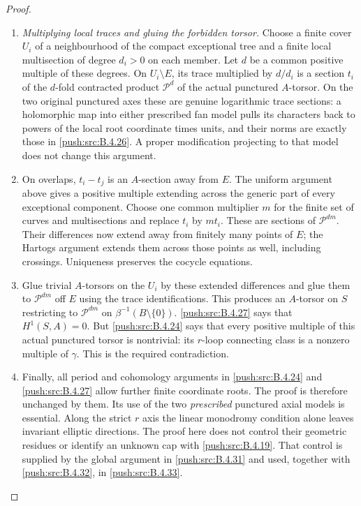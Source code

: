 \begin{proof}
\begin{enumerate}[label=\arabic*.,leftmargin=*]
\item \emph{Multiplying local traces and gluing the forbidden torsor.}
Choose a finite cover $U_i$ of a
neighbourhood of the compact exceptional
tree and a finite local multisection of
degree $d_i>0$ on each member. Let $d$ be
a common positive multiple of these degrees.
On $U_i\setminus E$, its trace multiplied
by $d/d_i$ is a section $t_i$ of the
$d$-fold contracted product $\mathcal P^d$
of the actual punctured $A$-torsor.
On the two original punctured axes these
are genuine logarithmic trace sections:
a holomorphic map into either prescribed
fan model pulls its characters back to
powers of the local root coordinate times
units, and their norms are exactly those
in \ref{push:src:B.4.26}. A proper modification projecting
to that model does not change this argument.

\item On overlaps, $t_i-t_j$ is an $A$-section
away from $E$. The uniform argument above
gives a positive multiple extending across
the generic part of every exceptional
component. Choose one common multiplier
$m$ for the finite set of curves and
multisections and replace $t_i$ by $mt_i$.
These are sections of $\mathcal P^{dm}$.
Their differences now extend away from
finitely many points of $E$; the Hartogs
argument extends them across those points
as well, including crossings. Uniqueness
preserves the cocycle equations.

\item Glue trivial $A$-torsors on the $U_i$ by
these extended differences and glue them
to $\mathcal P^{dm}$ off $E$ using the
trace identifications. This produces an
$A$-torsor on $S$ restricting to
$\mathcal P^{dm}$ on
$\beta^{-1}(B\setminus\{0\})$.
\ref{push:src:B.4.27} says that $H^1(S,A)=0$.
But \ref{push:src:B.4.24} says that every positive
multiple of this actual punctured torsor
is nontrivial: its $r$-loop connecting
class is a nonzero multiple of $\gamma$.
This is the required contradiction.

\item Finally, all period and cohomology arguments
in \ref{push:src:B.4.24} and \ref{push:src:B.4.27} allow further finite
coordinate roots. The proof is therefore
unchanged by them. Its use of the two
\emph{prescribed} punctured axial models
is essential. Along the strict $r$ axis the linear monodromy
condition alone leaves invariant elliptic directions.
The proof here does not control their geometric
residues or identify an unknown cap with \ref{push:src:B.4.19}.
That control is supplied by the global argument in
\ref{push:src:B.4.31} and used, together with \ref{push:src:B.4.32}, in \ref{push:src:B.4.33}.
\end{enumerate}
\end{proof}

